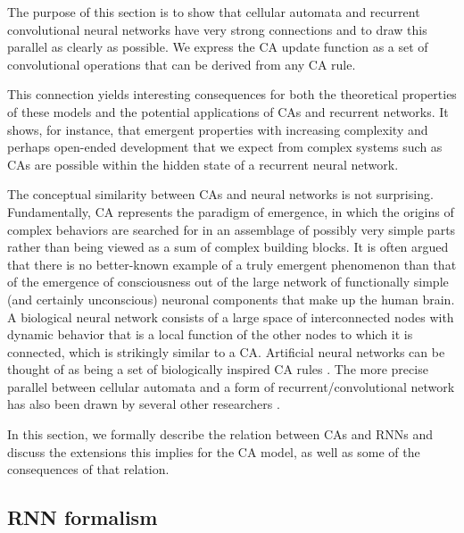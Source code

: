 The purpose of this section is to show that cellular automata and recurrent
convolutional neural networks have very strong connections and to draw this
parallel as clearly as possible. We express the \ac{CA} update function as a set
of convolutional operations that can be derived from any \ac{CA} rule.

This connection yields interesting consequences for both the theoretical
properties of these models and the potential applications of \acp{CA} and
recurrent networks. It shows, for instance, that emergent properties with
increasing complexity and perhaps open-ended development that we expect from
complex systems such as \acp{CA} are possible within the hidden state of a
recurrent neural network.

The conceptual similarity between \acp{CA} and neural networks is not surprising. 
Fundamentally, \ac{CA} represents the paradigm of emergence, in which
the origins of complex behaviors are searched for in an assemblage of possibly
very simple parts rather than being viewed as a sum of complex building blocks. It is
often argued that there is no better-known example of a truly emergent
phenomenon than that of the emergence of consciousness out of the large network
of functionally simple (and certainly unconscious) neuronal components that make
up the human brain. A biological neural network consists of a
large space of interconnected nodes with dynamic behavior that is a local
function of the other nodes to which it is connected, which is strikingly similar
to a \ac{CA}. Artificial neural networks can
be thought of as being a set of biologically inspired CA rules
\parencite{ilachinskiCellularAutomataDiscrete2001}. The more precise parallel
between cellular automata and a form of recurrent/convolutional network has also
been drawn by several other researchers
\parencite{wulffLearningCellularAutomaton1993,
  gilpinCellularAutomataConvolutional2018,
  mordvintsevGrowingNeuralCellular2020}.

In this section, we formally describe the relation between \acp{CA} and \acp{RNN}
and discuss the extensions this implies for the \ac{CA} model, as well as some of
the consequences of that relation.

\subsection{RNN formalism}

